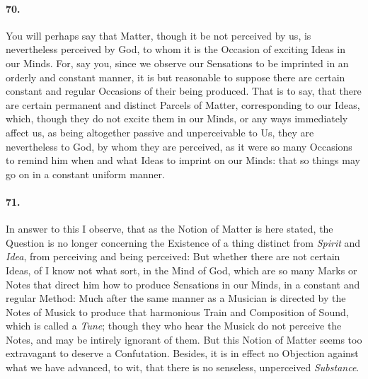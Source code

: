 \documentclass[]{article}
\newenvironment{sectionbody}{\begin{multicols}{2}}{\end{multicols}}
\begin{document}
\begin{sectionbody}
\paragraph{70.} You will perhaps say that Matter, though it be not perceived by
us, is nevertheless perceived by {\sc God}, to whom it is the Occasion
of exciting Ideas in our Minds.  For, say you, since we observe
our Sensations to be imprinted in an orderly and constant manner,
it is but reasonable to suppose there are certain constant and
regular Occasions of their being produced.  That is to say, that
there are certain permanent and distinct Parcels of Matter,
corresponding to our Ideas, which, though they do not excite them
in our Minds, or any ways immediately affect us, as being
altogether passive and unperceivable to Us, they are nevertheless
to {\sc God}, by whom they are perceived, as it were so many Occasions
to remind him when and what Ideas to imprint on our Minds: that
so things may go on in a constant uniform manner.



\paragraph{71.} In answer to this I observe, that as the Notion of Matter is here
stated, the Question is no longer concerning the Existence of a
thing distinct from \emph{Spirit} and \emph{Idea}, from
perceiving and being perceived: But whether there are not certain
Ideas, of I know not what sort, in the Mind of {\sc God}, which are so
many Marks or Notes that direct him how to produce Sensations in
our Minds, in a constant and regular Method: Much after the same
manner as a Musician is directed by the Notes of Musick to
produce that harmonious Train and Composition of Sound, which is
called a \emph{Tune}; though they who hear the Musick do not
perceive the Notes, and may be intirely ignorant of them.  But
this Notion of Matter seems too extravagant to deserve a
Confutation.  Besides, it is in effect no Objection against what
we have advanced, to wit, that there is no senseless, unperceived
\emph{Substance}.




\end{sectionbody}
\end{document}
